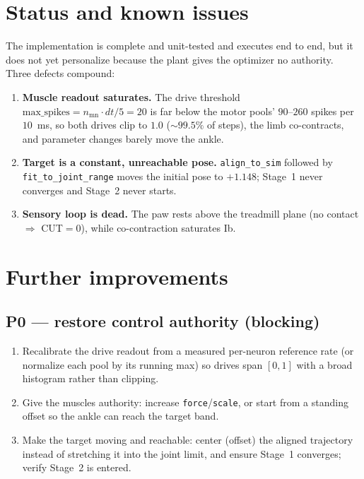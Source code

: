 \documentclass[11pt]{article}
\begin{document}
\section{Status and known issues}
\label{sec:status}

The implementation is complete and unit-tested and executes end to end, but it
does not yet personalize because the plant gives the optimizer no authority.
Three defects compound:

\begin{enumerate}
  \item \textbf{Muscle readout saturates.} The drive threshold
        $\text{max\_spikes}=n_{\text{mn}}\cdot dt/5 = 20$ is far below the motor
        pools' $90$--$260$ spikes per $10$~ms, so both drives clip to $1.0$
        ($\sim\!99.5\%$ of steps), the limb co-contracts, and parameter changes
        barely move the ankle.
  \item \textbf{Target is a constant, unreachable pose.} \texttt{align\_to\_sim}
        followed by \texttt{fit\_to\_joint\_range} moves the initial pose to
        $+1.148$; Stage~1 never converges and Stage~2 never starts.
  \item \textbf{Sensory loop is dead.} The paw rests above the treadmill plane
        (no contact $\Rightarrow$ CUT$=0$), while co-contraction saturates Ib.
\end{enumerate}

\section{Further improvements}
\label{sec:future}

\subsection*{P0 --- restore control authority (blocking)}
\begin{enumerate}
  \item Recalibrate the drive readout from a measured per-neuron reference rate
        (or normalize each pool by its running max) so drives span $[0,1]$ with
        a broad histogram rather than clipping.
  \item Give the muscles authority: increase \texttt{force}/\texttt{scale}, or
        start from a standing offset so the ankle can reach the target band.
  \item Make the target moving and reachable: center (offset) the aligned
        trajectory instead of stretching it into the joint limit, and ensure
        Stage~1 converges; verify Stage~2 is entered.
\end{enumerate}
\end{document}
